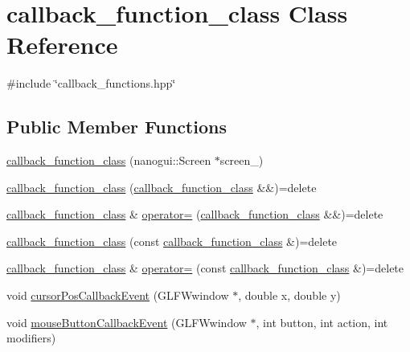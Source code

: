 \hypertarget{classcallback__function__class}{}\section{callback\+\_\+function\+\_\+class Class Reference}
\label{classcallback__function__class}


{\ttfamily \#include \char`\"{}callback\+\_\+functions.\+hpp\char`\"{}}

\subsection*{Public Member Functions}
\begin{DoxyCompactItemize}
\item 
\mbox{\hyperlink{classcallback__function__class_a57fb8498117533dce172a53182182787}{callback\+\_\+function\+\_\+class}} (nanogui\+::\+Screen $\ast$screen\+\_\+)
\item 
\mbox{\hyperlink{classcallback__function__class_a1fae5711b34c371261d280afb9085756}{callback\+\_\+function\+\_\+class}} (\mbox{\hyperlink{classcallback__function__class}{callback\+\_\+function\+\_\+class}} \&\&)=delete
\item 
\mbox{\hyperlink{classcallback__function__class}{callback\+\_\+function\+\_\+class}} \& \mbox{\hyperlink{classcallback__function__class_add0667bafa4b40d9726fe353f02a969a}{operator=}} (\mbox{\hyperlink{classcallback__function__class}{callback\+\_\+function\+\_\+class}} \&\&)=delete
\item 
\mbox{\hyperlink{classcallback__function__class_a966edfa3807e811f7e9b9c1ee2185b3e}{callback\+\_\+function\+\_\+class}} (const \mbox{\hyperlink{classcallback__function__class}{callback\+\_\+function\+\_\+class}} \&)=delete
\item 
\mbox{\hyperlink{classcallback__function__class}{callback\+\_\+function\+\_\+class}} \& \mbox{\hyperlink{classcallback__function__class_abe53fd6cc7a9a772b725144dc3deaa4b}{operator=}} (const \mbox{\hyperlink{classcallback__function__class}{callback\+\_\+function\+\_\+class}} \&)=delete
\item 
void \mbox{\hyperlink{classcallback__function__class_a29cef5bc1458b2189e026310e0774e66}{cursor\+Pos\+Callback\+Event}} (G\+L\+F\+Wwindow $\ast$, double x, double y)
\item 
void \mbox{\hyperlink{classcallback__function__class_a8810c94bf06c7dd9f2308219aaaff8b3}{mouse\+Button\+Callback\+Event}} (G\+L\+F\+Wwindow $\ast$, int button, int action, int modifiers)

\end{DoxyCompactItemize}

